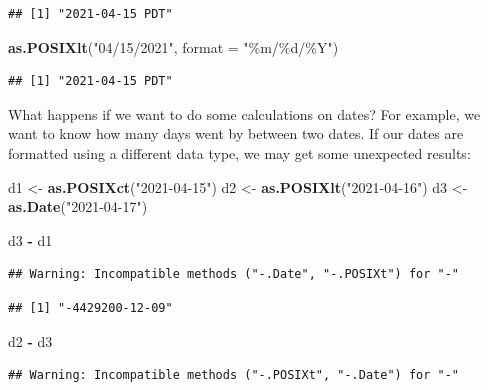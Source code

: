 \documentclass[
]{book}
\newenvironment{Shaded}{\begin{snugshade}}{\end{snugshade}}
\newcommand{\AttributeTok}[1]{\textcolor[rgb]{0.13,0.29,0.53}{#1}}
\newcommand{\FunctionTok}[1]{\textcolor[rgb]{0.13,0.29,0.53}{\textbf{#1}}}
\newcommand{\NormalTok}[1]{#1}
\newcommand{\OtherTok}[1]{\textcolor[rgb]{0.56,0.35,0.01}{#1}}
\newcommand{\SpecialCharTok}[1]{\textcolor[rgb]{0.81,0.36,0.00}{\textbf{#1}}}
\newcommand{\StringTok}[1]{\textcolor[rgb]{0.31,0.60,0.02}{#1}}
\begin{document}
\begin{verbatim}
## [1] "2021-04-15 PDT"
\end{verbatim}

\begin{Shaded}
\begin{Highlighting}[]
\FunctionTok{as.POSIXlt}\NormalTok{(}\StringTok{"04/15/2021"}\NormalTok{, }\AttributeTok{format =} \StringTok{"\%m/\%d/\%Y"}\NormalTok{)}
\end{Highlighting}
\end{Shaded}

\begin{verbatim}
## [1] "2021-04-15 PDT"
\end{verbatim}

What happens if we want to do some calculations on dates? For example, we want to know how many days went by between two dates. If our dates are formatted using a different data type, we may get some unexpected results:

\begin{Shaded}
\begin{Highlighting}[]
\NormalTok{d1 }\OtherTok{\textless{}{-}} \FunctionTok{as.POSIXct}\NormalTok{(}\StringTok{"2021{-}04{-}15"}\NormalTok{)}
\NormalTok{d2 }\OtherTok{\textless{}{-}} \FunctionTok{as.POSIXlt}\NormalTok{(}\StringTok{"2021{-}04{-}16"}\NormalTok{)}
\NormalTok{d3 }\OtherTok{\textless{}{-}} \FunctionTok{as.Date}\NormalTok{(}\StringTok{"2021{-}04{-}17"}\NormalTok{)}

\NormalTok{d3 }\SpecialCharTok{{-}}\NormalTok{ d1}
\end{Highlighting}
\end{Shaded}

\begin{verbatim}
## Warning: Incompatible methods ("-.Date", "-.POSIXt") for "-"
\end{verbatim}

\begin{verbatim}
## [1] "-4429200-12-09"
\end{verbatim}

\begin{Shaded}
\begin{Highlighting}[]
\NormalTok{d2 }\SpecialCharTok{{-}}\NormalTok{ d3}
\end{Highlighting}
\end{Shaded}

\begin{verbatim}
## Warning: Incompatible methods ("-.POSIXt", "-.Date") for "-"
\end{verbatim}
\end{document}
